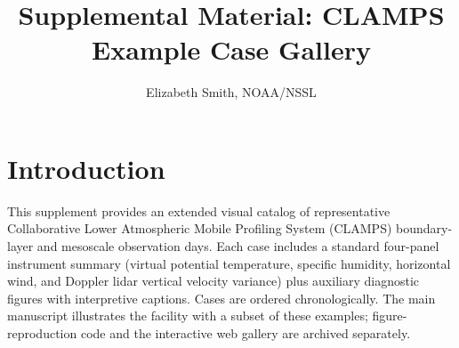 \documentclass[11pt]{article}
\title{Supplemental Material: CLAMPS Example Case Gallery}
\author{Elizabeth Smith, NOAA/NSSL}
\date{}
\begin{document}
\maketitle

\section*{Introduction}
This supplement provides an extended visual catalog of representative Collaborative Lower Atmospheric Mobile Profiling System (CLAMPS) boundary-layer and mesoscale observation days. Each case includes a standard four-panel instrument summary (virtual potential temperature, specific humidity, horizontal wind, and Doppler lidar vertical velocity variance) plus auxiliary diagnostic figures with interpretive captions. Cases are ordered chronologically. The main manuscript illustrates the facility with a subset of these examples; figure-reproduction code and the interactive web gallery are archived separately.
\end{document}
